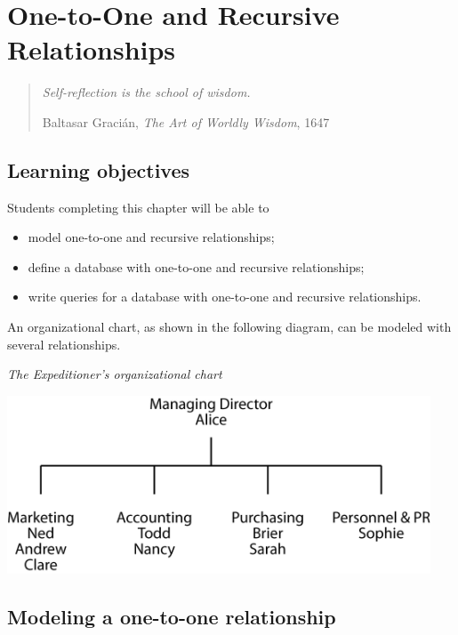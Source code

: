 \documentclass[
]{article}
\begin{document}
\hypertarget{one-to-one-and-recursive-relationships}{%
\section{One-to-One and Recursive Relationships}\label{one-to-one-and-recursive-relationships}}

\begin{quote}
\emph{Self-reflection is the school of wisdom.}

Baltasar Gracián, \emph{The Art of Worldly Wisdom}, 1647
\end{quote}

\hypertarget{learning-objectives-5}{%
\subsection*{Learning objectives}\label{learning-objectives-5}}

Students completing this chapter will be able to

\begin{itemize}
\item
  model one-to-one and recursive relationships;
\item
  define a database with one-to-one and recursive relationships;
\item
  write queries for a database with one-to-one and recursive
  relationships.
\end{itemize}

An organizational chart, as shown in the following diagram, can be
modeled with several relationships.

\emph{The Expeditioner's organizational chart}

\includegraphics[width=4.95833in,height=\textheight]{Figures/Chapter 6/org chart.png}

\hypertarget{modeling-a-one-to-one-relationship}{%
\subsection*{Modeling a one-to-one relationship}\label{modeling-a-one-to-one-relationship}}
\end{document}
